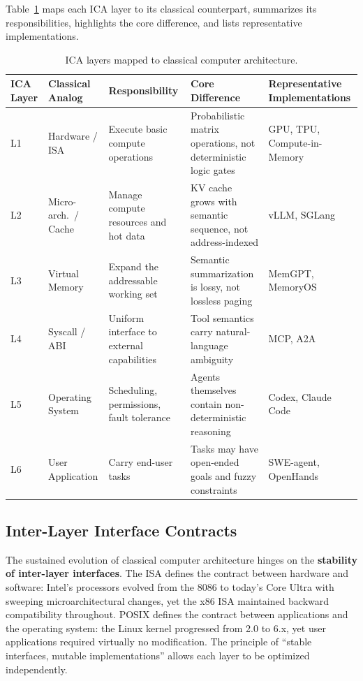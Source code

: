 Table~\ref{tab:icam} maps each ICA layer to its classical counterpart, summarizes its responsibilities, highlights the core difference, and lists representative implementations.

\begin{table}[t]
\centering
\footnotesize
\caption{ICA layers mapped to classical computer architecture.}
\label{tab:icam}
\begin{tabularx}{\textwidth}{p{}p{}p{}p{}p{}}
\toprule
ICA Layer & Classical Analog & Responsibility & Core Difference & Representative Implementations \\
\midrule
L1 & Hardware / ISA & Execute basic compute operations & Probabilistic matrix operations, not deterministic logic gates & GPU, TPU, Compute-in-Memory~\cite{wolters2024computeinmemory} \\
L2 & Micro-arch.\ / Cache & Manage compute resources and hot data & KV cache grows with semantic sequence, not address-indexed & vLLM, SGLang~\cite{kwon2023pagedattention,sglang2024} \\
L3 & Virtual Memory & Expand the addressable working set & Semantic summarization is lossy, not lossless paging & MemGPT, MemoryOS~\cite{memgpt2023,memoryos2025} \\
L4 & Syscall / ABI & Uniform interface to external capabilities & Tool semantics carry natural-language ambiguity & MCP, A2A~\cite{mcp_intro_2026,agentprotocols2025} \\
L5 & Operating System & Scheduling, permissions, fault tolerance & Agents themselves contain non-deterministic reasoning & Codex, Claude Code~\cite{openai_codex_overview_2026,anthropic_claudecode_overview_2026} \\
L6 & User Application & Carry end-user tasks & Tasks may have open-ended goals and fuzzy constraints & SWE-agent, OpenHands~\cite{sweagent2024,openhands_paper_2025} \\
\bottomrule
\end{tabularx}
\end{table}

\subsection{Inter-Layer Interface Contracts}
\label{sec:icam-interfaces}

The sustained evolution of classical computer architecture hinges on the \textbf{stability of inter-layer interfaces}. The ISA defines the contract between hardware and software: Intel's processors evolved from the 8086 to today's Core Ultra with sweeping microarchitectural changes, yet the x86 ISA maintained backward compatibility throughout. POSIX defines the contract between applications and the operating system: the Linux kernel progressed from 2.0 to 6.x, yet user applications required virtually no modification. The principle of ``stable interfaces, mutable implementations'' allows each layer to be optimized independently.

